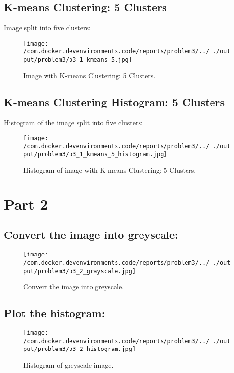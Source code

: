 \documentclass{article}%
\begin{document}
%
\subsection{K{-}means Clustering: 5 Clusters}%
\label{subsec:K{-}meansClustering5Clusters}%
Image split into five clusters:%


\begin{figure}[h!]%
\centering%
\texttt{[image: /com.docker.devenvironments.code/reports/problem3/../../output/problem3/p3\_1\_kmeans\_5.jpg]}%
\caption{Image with K{-}means Clustering: 5 Clusters.}%
\end{figure}

%
\subsection{K{-}means Clustering Histogram: 5 Clusters}%
\label{subsec:K{-}meansClusteringHistogram5Clusters}%
Histogram of the image split into five clusters:%


\begin{figure}[h!]%
\centering%
\texttt{[image: /com.docker.devenvironments.code/reports/problem3/../../output/problem3/p3\_1\_kmeans\_5\_histogram.jpg]}%
\caption{Histogram of image with K{-}means Clustering: 5 Clusters.}%
\end{figure}

%
\section{Part 2}%
\label{sec:Part2}%
\subsection{Convert the image into greyscale:}%
\label{subsec:Converttheimageintogreyscale}%


\begin{figure}[h!]%
\centering%
\texttt{[image: /com.docker.devenvironments.code/reports/problem3/../../output/problem3/p3\_2\_grayscale.jpg]}%
\caption{Convert the image into greyscale.}%
\end{figure}

%
\subsection{Plot the histogram:}%
\label{subsec:Plotthehistogram}%


\begin{figure}[h!]%
\centering%
\texttt{[image: /com.docker.devenvironments.code/reports/problem3/../../output/problem3/p3\_2\_histogram.jpg]}%
\caption{Histogram of greyscale image.}%
\end{figure}
\end{document}
